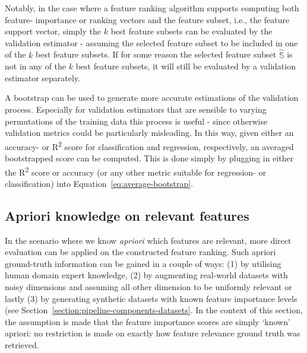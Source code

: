 \documentclass[../main.tex]{subfiles}
\begin{document}
Notably, in the case where a feature ranking algorithm supports computing both feature- importance or ranking vectors and the feature subset, i.e., the feature support vector, simply the $k$ best feature subsets can be evaluated by the validation estimator - assuming the selected feature subset to be included in one of the $k$ best feature subsets. If for some reason the selected feature subset $\hat{\mathbb{S}}$ is not in any of the $k$ best feature subsets, it will still be evaluated by a validation estimator separately.

A bootstrap can be used to generate more accurate estimations of the validation process. Especially for validation estimators that are sensible to varying permutations of the training data this process is useful - since otherwise validation metrics could be particularly misleading. In this way, given either an accuracy- or R\textsuperscript{2} score for classification and regression, respectively, an averaged bootstrapped score can be computed. This is done simply by plugging in either the R\textsuperscript{2} score or accuracy (or any other metric suitable for regression- or classification) into Equation~\ref{eq:average-bootstrap}.





\subsection{Apriori knowledge on relevant features}\label{section:evaluation-apriori-knowledge}
In the scenario where we know \textit{\gls{apriori}} which features are relevant, more direct evaluation can be applied on the constructed feature ranking. Such apriori ground-truth information can be gained in a couple of ways: (1) by utilising human domain expert knowledge, (2) by augmenting real-world datasets with noisy dimensions and assuming all other dimension to be uniformly relevant or lastly (3) by generating synthetic datasets with known feature importance levels (see Section~\ref{section:pipeline-components-datasets}. In the context of this section, the assumption is made that the feature importance scores are simply `known' apriori: no restriction is made on exactly how feature relevance ground truth was retrieved.
\end{document}
